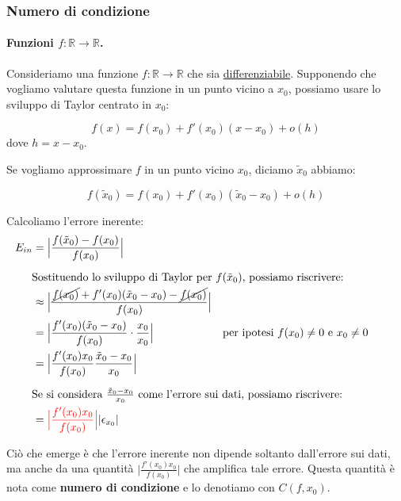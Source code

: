 \documentclass{article}
\begin{document}
\subsubsection{Numero di condizione}
\paragraph{Funzioni $f:\mathbb{R}\rightarrow \mathbb{R}$.}
Consideriamo una funzione $f:\mathbb{R}\rightarrow \mathbb{R}$ che sia
\underline{differenziabile}. Supponendo che vogliamo valutare questa funzione in un
punto vicino a $x_0$, possiamo usare lo sviluppo di Taylor centrato in
$x_0$:

$$f(x)=f(x_0)+f'(x_0)(x-x_0)+o(h)$$
dove $h=x-x_0$.

Se vogliamo approssimare $f$ in un punto vicino $x_0$, diciamo
$\tilde{x}_0$ abbiamo:

$$f(\tilde{x}_0)=f(x_0)+f'(x_0)(\tilde{x}_0-x_0)+o(h)$$

Calcoliamo l'errore inerente:
\begin{equation*}
    \begin{aligned}
        E_{in}&= \Big\lvert \frac{f(\tilde{x}_0)-f(x_0)}{f(x_0)}\Big\rvert \\
            \alignedintertext{Sostituendo lo sviluppo di Taylor per
            $f(\tilde{x}_0)$, possiamo riscrivere:}
            &\approx \Big\lvert
            \frac{\cancel{f(x_0)}+f'(x_0)(\tilde{x}_0-x_0)-\cancel{f(x_0)}}{f(x_0)}\Big\rvert\\
            &=\Big\lvert
            \frac{f'(x_0)(\tilde{x}_0-x_0)}{f(x_0)}\cdot \frac{x_0}{x_0}\Big\rvert & \text{per ipotesi }
            f(x_0)\neq0 \text{ e }x_0\neq0\\ 
            &= \Big\lvert
            \frac{f'(x_0)x_0}{f(x_0)}\frac{\tilde{x}_0-x_0}{x_0}\Big\rvert\\ 
            \alignedintertext{Se si considera
            $\frac{\tilde{x}_0-x_0}{x_0}$ come 
            l'errore sui dati, possiamo riscrivere:}
            &= {\color{red}\Big\lvert \frac{f'(x_0)x_0}{f(x_0)}\Big\rvert} \lvert
            \epsilon_{x_0}\rvert
    \end{aligned}
\end{equation*}

Ciò che emerge è che l'errore inerente non dipende soltanto dall'errore sui
dati, ma anche da una quantità $\Big\lvert \frac{f'(x_0)x_0}{f(x_0)}\Big\rvert$ che amplifica tale errore.
Questa quantità è nota come \textbf{numero di condizione} e lo denotiamo con
$C(f, x_0)$. 
\end{document}
